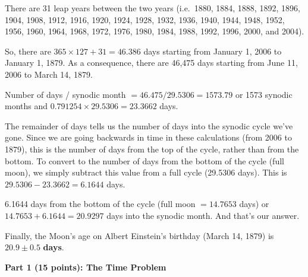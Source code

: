 There are 31 leap years between the two years (i.e.\ 1880, 1884, 1888, 1892,
1896, 1904, 1908, 1912, 1916, 1920, 1924, 1928, 1932, 1936, 1940, 1944, 1948,
1952, 1956, 1960, 1964, 1968, 1972, 1976, 1980, 1984, 1988, 1992, 1996, 2000,
and 2004).

So, there are $365 \times 127 + 31 = 46.386$ days starting from January 1,
2006 to January 1, 1879. As a consequence, there are 46,475 days starting from
June 11, 2006 to March 14, 1879.

Number of days / synodic month $= 46.475/29.5306 = 1573.79$
or 1573 synodic months and $0.791254 \times 29.5306 = 23.3662$ days.

The remainder of days tells us the number of days into the synodic cycle we've
gone. Since we are going backwards in time in these calculations (from 2006 to
1879), this is the number of days from the top of the cycle, rather than from
the bottom. To convert to the number of days from the bottom of the cycle
(full moon), we simply subtract this value from a full cycle (29.5306 days).
This is $29.5306 - 23.3662 = 6.1644$ days.

6.1644 days from the bottom of the cycle (full moon $= 14.7653$ days) or
$14.7653 + 6.1644 = 20.9297$ days into the synodic month. And that's our
answer.

Finally, the Moon's age on Albert Einstein's birthday (March 14, 1879) is
$\mathbf{20.9 \pm 0.5}$ \textbf{days}.


\medskip\noindent\textbf{Part 1 (15 points): The Time Problem}

